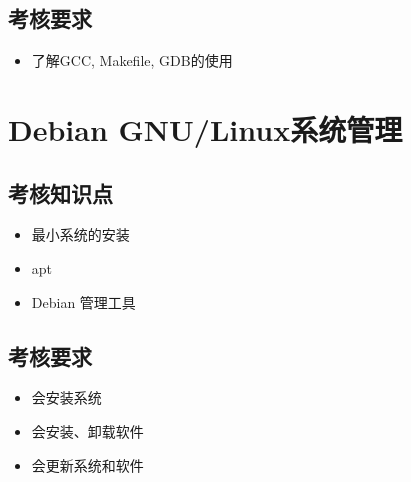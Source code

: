 \documentclass{wx672ctexart} \usepackage{wx672hyperref}
\begin{document}
\subsection{考核要求}
\label{sec:org8a181b3}
\begin{itemize}
\item 了解GCC, Makefile, GDB的使用
\end{itemize}
\section{Debian GNU/Linux系统管理}
\label{sec:orgc077dd4}
\subsection{考核知识点}
\label{sec:orgd359419}
\begin{itemize}
\item 最小系统的安装
\item apt
\item Debian 管理工具
\end{itemize}
\subsection{考核要求}
\label{sec:org7ecdc15}
\begin{itemize}
\item 会安装系统
\item 会安装、卸载软件
\item 会更新系统和软件
\end{itemize}
\end{document}
